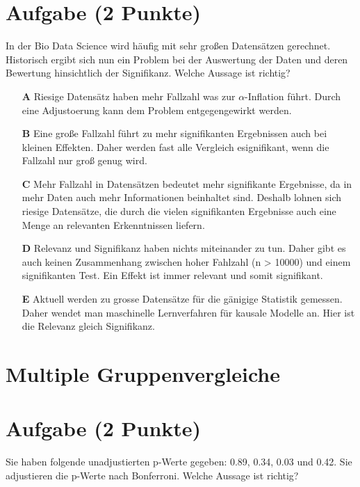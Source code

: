 \documentclass[a4paper, 9pt]{scrartcl}\usepackage[]{graphicx}\usepackage[]{xcolor}
\begin{document}
\section{Aufgabe \hfill (2 Punkte)}



In der Bio Data Science wird häufig mit sehr großen Datensätzen gerechnet. Historisch ergibt sich nun ein Problem bei der Auswertung der Daten und deren Bewertung hinsichtlich der Signifikanz. Welche Aussage ist richtig?





\begin{enumerate}
\item [\textbf{A} \msquare] Riesige Datensätz haben mehr Fallzahl was zur $\alpha$-Inflation führt. Durch eine Adjustoerung kann dem Problem entgegengewirkt werden.
\item [\textbf{B} \msquare] Eine große Fallzahl führt zu mehr signifikanten Ergebnissen auch bei kleinen Effekten. Daher werden fast alle Vergleich esignifikant, wenn die Fallzahl nur groß genug wird.
\item [\textbf{C} \msquare] Mehr Fallzahl in Datensätzen bedeutet mehr signifikante Ergebnisse, da in mehr Daten auch mehr Informationen beinhaltet sind. Deshalb lohnen sich riesige Datensätze, die durch die vielen signifikanten Ergebnisse auch eine Menge an relevanten Erkenntnissen liefern.
\item [\textbf{D} \msquare] Relevanz und Signifikanz haben nichts miteinander zu tun. Daher gibt es auch keinen Zusammenhang zwischen hoher Fahlzahl (n > 10000) und einem signifikanten Test. Ein Effekt ist immer relevant und somit signifikant.
\item [\textbf{E} \msquare] Aktuell werden zu grosse Datensätze für die gänigige Statistik gemessen. Daher wendet man maschinelle Lernverfahren für kausale Modelle an. Hier ist die Relevanz gleich Signifikanz.
\end{enumerate}
\section*{Multiple Gruppenvergleiche}    

\section{Aufgabe \hfill (2 Punkte)}



Sie haben folgende unadjustierten p-Werte gegeben: 0.89, 0.34, 0.03 und 0.42. Sie adjustieren die p-Werte nach
Bonferroni. Welche Aussage ist richtig?
\end{document}
